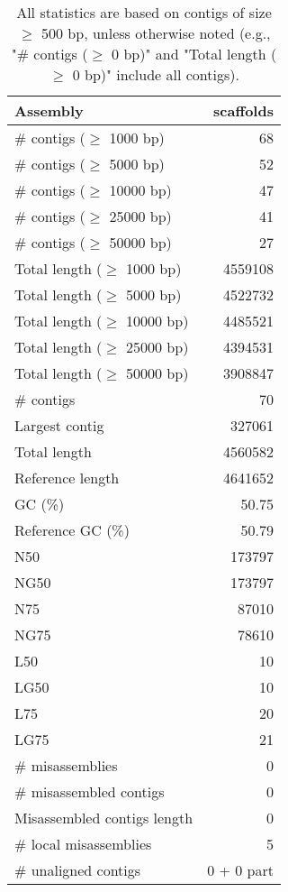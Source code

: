 \documentclass[12pt,a4paper]{article}
\begin{document}
\begin{table}[ht]
\begin{center}
\caption{All statistics are based on contigs of size $\geq$ 500 bp, unless otherwise noted (e.g., "\# contigs ($\geq$ 0 bp)" and "Total length ($\geq$ 0 bp)" include all contigs).}
\begin{tabular}{|l*{1}{|r}|}
\hline
Assembly & scaffolds \\ \hline
\# contigs ($\geq$ 1000 bp) & 68 \\ \hline
\# contigs ($\geq$ 5000 bp) & 52 \\ \hline
\# contigs ($\geq$ 10000 bp) & 47 \\ \hline
\# contigs ($\geq$ 25000 bp) & 41 \\ \hline
\# contigs ($\geq$ 50000 bp) & 27 \\ \hline
Total length ($\geq$ 1000 bp) & 4559108 \\ \hline
Total length ($\geq$ 5000 bp) & 4522732 \\ \hline
Total length ($\geq$ 10000 bp) & 4485521 \\ \hline
Total length ($\geq$ 25000 bp) & 4394531 \\ \hline
Total length ($\geq$ 50000 bp) & 3908847 \\ \hline
\# contigs & 70 \\ \hline
Largest contig & 327061 \\ \hline
Total length & 4560582 \\ \hline
Reference length & 4641652 \\ \hline
GC (\%) & 50.75 \\ \hline
Reference GC (\%) & 50.79 \\ \hline
N50 & 173797 \\ \hline
NG50 & 173797 \\ \hline
N75 & 87010 \\ \hline
NG75 & 78610 \\ \hline
L50 & 10 \\ \hline
LG50 & 10 \\ \hline
L75 & 20 \\ \hline
LG75 & 21 \\ \hline
\# misassemblies & 0 \\ \hline
\# misassembled contigs & 0 \\ \hline
Misassembled contigs length & 0 \\ \hline
\# local misassemblies & 5 \\ \hline
\# unaligned contigs & 0 + 0 part \\ \hline

\end{tabular}
\end{center}
\end{table}
\end{document}
